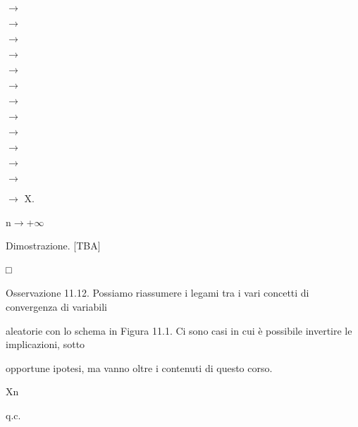 \documentclass[a4paper,portrait,12pt]{article}
\begin{document}
$\rightarrow$


$\rightarrow$


$\rightarrow$


$\rightarrow$


$\rightarrow$


$\rightarrow$


$\rightarrow$


$\rightarrow$


$\rightarrow$


$\rightarrow$


$\rightarrow$


$\rightarrow$


\begin{flushleft}
$\rightarrow$ X.
\end{flushleft}


\begin{flushleft}
n$\rightarrow$+$\infty$
\end{flushleft}





\begin{flushleft}
Dimostrazione. [TBA]
\end{flushleft}





□





\begin{flushleft}
Osservazione 11.12. Possiamo riassumere i legami tra i vari concetti di convergenza di variabili
\end{flushleft}


\begin{flushleft}
aleatorie con lo schema in Figura 11.1. Ci sono casi in cui \`{e} possibile invertire le implicazioni, sotto
\end{flushleft}


\begin{flushleft}
opportune ipotesi, ma vanno oltre i contenuti di questo corso.
\end{flushleft}


\begin{flushleft}
Xn
\end{flushleft}





\begin{flushleft}
q.c.
\end{flushleft}
\end{document}
